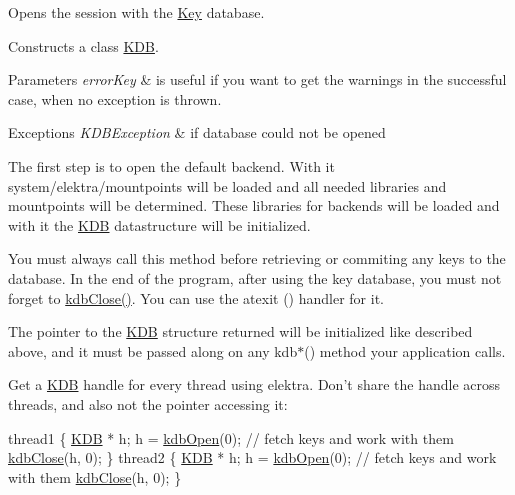 Opens the session with the \hyperlink{classkdb_1_1Key}{Key} database.  

Constructs a class \hyperlink{classkdb_1_1KDB}{K\-D\-B}.


\begin{DoxyParams}{Parameters}
{\em error\-Key} & is useful if you want to get the warnings in the successful case, when no exception is thrown.\\
\hline
\end{DoxyParams}

\begin{DoxyExceptions}{Exceptions}
{\em K\-D\-B\-Exception} & if database could not be opened\\
\hline
\end{DoxyExceptions}
The first step is to open the default backend. With it system/elektra/mountpoints will be loaded and all needed libraries and mountpoints will be determined. These libraries for backends will be loaded and with it the {\ttfamily \hyperlink{classkdb_1_1KDB}{K\-D\-B}} datastructure will be initialized.

You must always call this method before retrieving or commiting any keys to the database. In the end of the program, after using the key database, you must not forget to \hyperlink{group__kdb_gadb54dc9fda17ee07deb9444df745c96f}{kdb\-Close()}. You can use the atexit () handler for it.

The pointer to the {\ttfamily \hyperlink{classkdb_1_1KDB}{K\-D\-B}} structure returned will be initialized like described above, and it must be passed along on any kdb$\ast$() method your application calls.

Get a {\ttfamily \hyperlink{classkdb_1_1KDB}{K\-D\-B}} handle for every thread using elektra. Don't share the handle across threads, and also not the pointer accessing it\-: 
\begin{DoxyCode}
thread1
\{
        \hyperlink{classkdb_1_1KDB_a7e0637995ce9f294cdbc6f167df6db40}{KDB} * h;
        h = \hyperlink{group__kdb_ga6808defe5870f328dd17910aacbdc6ca}{kdbOpen}(0);
        \textcolor{comment}{// fetch keys and work with them}
        \hyperlink{group__kdb_gadb54dc9fda17ee07deb9444df745c96f}{kdbClose}(h, 0);
\}
thread2
\{
        \hyperlink{classkdb_1_1KDB_a7e0637995ce9f294cdbc6f167df6db40}{KDB} * h;
        h = \hyperlink{group__kdb_ga6808defe5870f328dd17910aacbdc6ca}{kdbOpen}(0);
        \textcolor{comment}{// fetch keys and work with them}
        \hyperlink{group__kdb_gadb54dc9fda17ee07deb9444df745c96f}{kdbClose}(h, 0);
\}
\end{DoxyCode}


